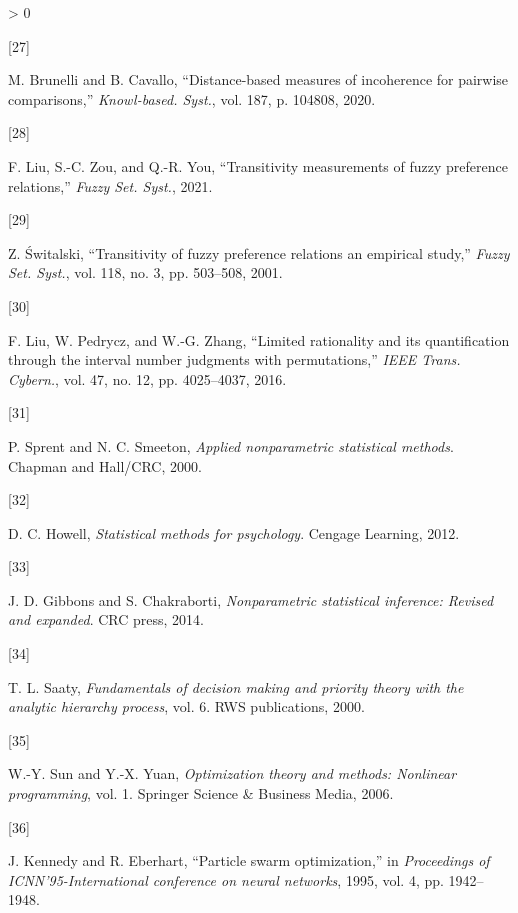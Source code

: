 \documentclass[
]{article}
\newlength{\cslhangindent}
\newlength{\csllabelwidth}
\newenvironment{CSLReferences}[2] %
 {%
  \setlength{\parindent}{0pt}
  \ifodd #1 \everypar{\setlength{\hangindent}{\cslhangindent}}\ignorespaces\fi
  \ifnum #2 > 0
  \setlength{\parskip}{#2\baselineskip}
  \fi
 }%
 {}
\newcommand{\CSLLeftMargin}[1]{\parbox[t]{\csllabelwidth}{#1}}
\newcommand{\CSLRightInline}[1]{\parbox[t]{\linewidth - \csllabelwidth}{#1}\break}
\begin{document}
\begin{CSLReferences}{0}{0}
\leavevmode\hypertarget{ref-brunelli2020distance}{}%
\CSLLeftMargin{{[}27{]} }
\CSLRightInline{M. Brunelli and B. Cavallo, {``Distance-based measures
of incoherence for pairwise comparisons,''} \emph{Knowl-based. Syst.},
vol. 187, p. 104808, 2020.}

\leavevmode\hypertarget{ref-liu2021transitivity}{}%
\CSLLeftMargin{{[}28{]} }
\CSLRightInline{F. Liu, S.-C. Zou, and Q.-R. You, {``Transitivity
measurements of fuzzy preference relations,''} \emph{Fuzzy Set. Syst.},
2021.}

\leavevmode\hypertarget{ref-switalski2001transitivity}{}%
\CSLLeftMargin{{[}29{]} }
\CSLRightInline{Z. Świtalski, {``Transitivity of fuzzy preference
relations {} an empirical study,''} \emph{Fuzzy Set. Syst.}, vol. 118,
no. 3, pp. 503--508, 2001.}

\leavevmode\hypertarget{ref-liu2016limited}{}%
\CSLLeftMargin{{[}30{]} }
\CSLRightInline{F. Liu, W. Pedrycz, and W.-G. Zhang, {``Limited
rationality and its quantification through the interval number judgments
with permutations,''} \emph{IEEE Trans. Cybern.}, vol. 47, no. 12, pp.
4025--4037, 2016.}

\leavevmode\hypertarget{ref-sprent2000applied}{}%
\CSLLeftMargin{{[}31{]} }
\CSLRightInline{P. Sprent and N. C. Smeeton, \emph{Applied nonparametric
statistical methods}. {Chapman and Hall/CRC}, 2000.}

\leavevmode\hypertarget{ref-howell2012statistical}{}%
\CSLLeftMargin{{[}32{]} }
\CSLRightInline{D. C. Howell, \emph{Statistical methods for psychology}.
{Cengage Learning}, 2012.}

\leavevmode\hypertarget{ref-gibbons2014nonparametric}{}%
\CSLLeftMargin{{[}33{]} }
\CSLRightInline{J. D. Gibbons and S. Chakraborti, \emph{Nonparametric
statistical inference: {Revised} and expanded}. {CRC press}, 2014.}

\leavevmode\hypertarget{ref-saaty2000fundamentals}{}%
\CSLLeftMargin{{[}34{]} }
\CSLRightInline{T. L. Saaty, \emph{Fundamentals of decision making and
priority theory with the analytic hierarchy process}, vol. 6. {RWS
publications}, 2000.}

\leavevmode\hypertarget{ref-sun2006optimization}{}%
\CSLLeftMargin{{[}35{]} }
\CSLRightInline{W.-Y. Sun and Y.-X. Yuan, \emph{Optimization theory and
methods: Nonlinear programming}, vol. 1. {Springer Science \& Business
Media}, 2006.}

\leavevmode\hypertarget{ref-kennedy1995particle}{}%
\CSLLeftMargin{{[}36{]} }
\CSLRightInline{J. Kennedy and R. Eberhart, {``Particle swarm
optimization,''} in \emph{Proceedings of {ICNN}'95-{International}
conference on neural networks}, 1995, vol. 4, pp. 1942--1948.}


\end{CSLReferences}
\end{document}
